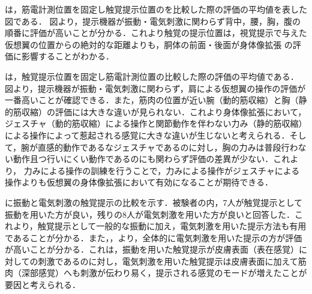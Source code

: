 \begin{small}



        

        は，筋電計測位置を固定し触覚提示位置のを比較した際の評価の平均値を表した図である．
        図より，提示機器が振動・電気刺激に関わらず背中，腰，胸，腹の順番に評価が高いことが分かる．これより触覚の提示位置は，視覚提示で与えた仮想翼の位置からの絶対的な距離よりも，胴体の前面・後面が身体像拡張
        の評価に影響することがわかる．

        は，触覚提示位置を固定し筋電計測位置の比較した際の評価の平均値である．
        図より，提示機器が振動・電気刺激に関わらず，肩による仮想翼の操作の評価が一番高いことが確認できる．また，筋肉の位置が近い腕（動的筋収縮）と胸（静的筋収縮）の評価には大きな違いが見られない．これより身体像拡張において，ジェスチャ（動的筋収縮）による操作と関節動作を伴わない力み（静的筋収縮）による操作によって惹起される感覚に大きな違いが生じないと考えられる．そして，腕が直感的動作であるなジェスチャであるのに対し，胸の力みは普段行わない動作且つ行いにくい動作であるのにも関わらず評価の差異が少ない．これより，
        力みによる操作の訓練を行うことで，力みによる操作がジェスチャによる操作よりも仮想翼の身体像拡張において有効になることが期待できる．

        に振動と電気刺激の触覚提示の比較を示す．被験者の内，7人が触覚提示として振動を用いた方が良い，残りの8人が電気刺激を用いた方が良いと回答した．これより，触覚提示として一般的な振動に加え，電気刺激を用いた提示方法も有用であることが分かる．また，，より，全体的に電気刺激を用いた提示の方が評価が高いことが分かる．これは，振動を用いた触覚提示が皮膚表面（表在感覚）に対しての刺激であるのに対し，電気刺激を用いた触覚提示は皮膚表面に加えて筋肉（深部感覚）へも刺激が伝わり易く，提示される感覚のモードが増えたことが要因と考えられる．


\end{small}
